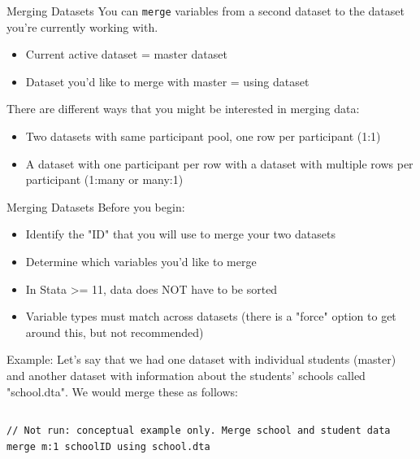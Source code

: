 \documentclass[table,smaller]{beamer}
\begin{document}
\begin{frame}[fragile,label=sec-6-1]{Merging Datasets}
 You can \verb~merge~ variables from a second dataset to the dataset you're currently working with.
\begin{itemize}
\item Current active dataset = master dataset
\item Dataset you'd like to merge with master = using dataset
\end{itemize}

There are different ways that you might be interested in merging data:
\begin{itemize}
\item Two datasets with same participant pool, one row per participant (1:1)
\item A dataset with one participant per row with a dataset with multiple rows per participant (1:many or many:1)
\end{itemize}
\end{frame}
\begin{frame}[fragile,label=sec-6-2]{Merging Datasets}
 Before you begin:
\begin{itemize}
\item Identify the "ID" that you will use to merge your two datasets
\item Determine which variables you'd like to merge
\item In Stata >= 11, data does NOT have to be sorted
\item Variable types must match across datasets (there is a "force" option to get around this, but not recommended)
\end{itemize}

Example: Let's say that we had one dataset with individual students (master) and another  dataset with information about the students' schools called "school.dta". We would merge these as follows:

\vspace{-.5em} \begin{columns}  \begin{block}{}
\begin{verbatim}
// Not run: conceptual example only. Merge school and student data
merge m:1 schoolID using school.dta
\end{verbatim}
\end{block} \end{columns}
\end{frame}
\end{document}
